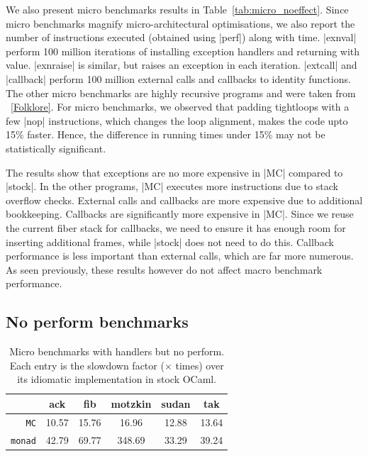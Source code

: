 \documentclass[sigplan,10pt,review,anonymous]{acmart}\settopmatter{printfolios=true,printccs=false,printacmref=false}
\begin{document}
We also present micro benchmarks results in Table~\ref{tab:micro_noeffect}.
Since micro benchmarks magnify micro-architectural optimisations, we also
report the number of instructions executed (obtained using |perf|) along with
time. |exnval| perform 100 million iterations of installing exception handlers
and returning with value. |exnraise| is similar, but raises an exception in
each iteration. |extcall| and |callback| perform 100 million external calls and
callbacks to identity functions. The other micro benchmarks are highly
recursive programs and were taken from ~\ref{Folklore}. For micro benchmarks,
we observed that padding tightloops with a few |nop| instructions, which
changes the loop alignment, makes the code upto 15\% faster. Hence, the
difference in running times under 15\% may not be statistically significant.

The results show that exceptions are no more expensive in |MC| compared to
|stock|. In the other programs, |MC| executes more instructions due to stack
overflow checks. External calls and callbacks are more expensive due to
additional bookkeeping. Callbacks are significantly more expensive in |MC|.
Since we reuse the current fiber stack for callbacks, we need to ensure it has
enough room for inserting additional frames, while |stock| does not need to do
this. Callback performance is less important than external calls, which are far
more numerous. As seen previously, these results however do not affect macro
benchmark performance.

\subsection{No perform benchmarks}

\begin{table}
\caption{Micro benchmarks with handlers but no perform. Each entry is the
	slowdown factor ($\times$ times) over its idiomatic implementation in stock OCaml.}
\vspace{-3mm}
{
\begin{tabular}{r c c c c c}
	& \textbf{ack} & \textbf{fib} & \textbf{motzkin} & \textbf{sudan} & \textbf{tak} \\ \hline
	\texttt{MC} 	 	& 10.57 & 15.76 & 16.96 & 12.88 & 13.64 \\
	\texttt{monad} 	& 42.79 & 69.77 & 348.69 & 33.29 & 39.24 \\ \hline
\end{tabular}
}
\label{tab:micro_noperform}
\end{table}
\end{document}
